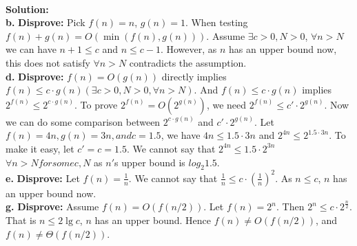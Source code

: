 \documentclass{article}
\theoremstyle{plain}
\begin{document}
\textbf{\\Solution:\\}
\textbf{b.} \textbf{Disprove:} Pick $f(n) = n$, $g(n) = 1$. When testing $f(n) + g(n) = O(\min(f(n), g(n)))$. Assume $\exists c > 0, N >0$, $\forall n > N$ we can have $n + 1 \leq c$ and $n \leq c - 1$. However, as $n$ has an upper bound now, this does not satisfy $\forall n > N$ contradicts the assumption.\\
\textbf{d.} \textbf{Disprove:} $f(n) = O(g(n))$ directly implies $f(n) \leq c \cdot g(n) (\exists c > 0, N >0, \forall n > N)$. And $f(n) \leq c \cdot g(n)$ implies $2^{f(n)} \leq 2^{c \cdot g(n)}$. To prove $2^{f(n)} = O(2^{g(n)})$, we need $2^{f(n)} \leq c' \cdot 2^{g(n)}$. Now we can do some comparison between $2^{c \cdot g(n)}$ and $c' \cdot 2^{g(n)}$. Let $f(n) = 4n, g(n) = 3n, and c = 1.5$, we have $4n \leq 1.5 \cdot 3n$ and $2^{4n} \leq 2^{1.5 \cdot 3n}$. To make it easy, let $c' = c = 1.5$. We cannot say that $2^{4n} \leq  1.5 \cdot 2^{3n}$ $\forall n > N for some c, N$ as $n'$s upper bound is $log_2 1.5$.\\ 
\textbf{e.} \textbf{Disprove:} Let $f(n) = \frac{1}{n}$. We cannot say that $\frac{1}{n} \leq c \cdot (\frac{1}{n})^2$. As $n \leq c$, $n$ has an upper bound now.\\
\textbf{g.} \textbf{Disprove:} Assume $f(n) = O(f(n/2))$. Let $f(n) = 2^n$. Then $2^n \leq c \cdot 2^{\frac{n}{2}}$. That is $n \leq 2 \lg c$, $n$ has an upper bound. Hence $f(n) \ne O(f(n/2))$, and $f(n) \ne \Theta(f(n/2))$.
\end{document}
